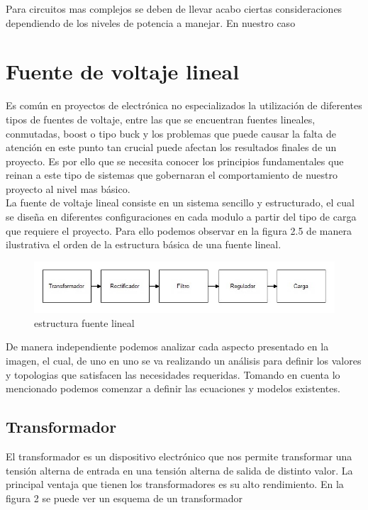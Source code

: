 Para circuitos mas complejos se deben de llevar acabo ciertas consideraciones dependiendo de los niveles de potencia a manejar. En nuestro caso 


\newpage
\section{Fuente de voltaje lineal}
Es común en proyectos de electrónica no especializados la utilización de diferentes tipos de fuentes de voltaje, entre las que se encuentran fuentes lineales, conmutadas, boost o tipo buck y los problemas que puede causar la falta de atención en este punto tan crucial puede afectan los resultados finales de un proyecto. Es por ello que se necesita conocer los principios fundamentales que reinan a este tipo de sistemas que gobernaran el comportamiento de nuestro proyecto al nivel mas básico.\\

La fuente de voltaje lineal consiste en un sistema sencillo y estructurado, el cual se diseña en diferentes configuraciones en cada modulo a partir del tipo de carga que requiere el proyecto. Para ello podemos observar en la figura 2.5 de manera ilustrativa el orden de la estructura básica de una fuente lineal.

\begin{figure}[H]
 \centering
 \includegraphics[width=12cm]{capitulo2/figs/fuentelineal.jpg}
 \caption{estructura fuente lineal}
 \end{figure}
 
 De manera independiente podemos analizar cada aspecto presentado en la imagen, el cual, de uno en uno se va realizando un análisis para definir los valores y topologias que satisfacen las necesidades requeridas. Tomando en cuenta lo mencionado podemos comenzar a definir las ecuaciones y modelos existentes.
\subsection{Transformador}
El transformador es un dispositivo electrónico que nos permite transformar una
tensión alterna de entrada en una tensión alterna de salida de distinto valor. La principal ventaja que tienen los transformadores es su alto rendimiento. En la figura 2 se puede ver un esquema de un transformador
